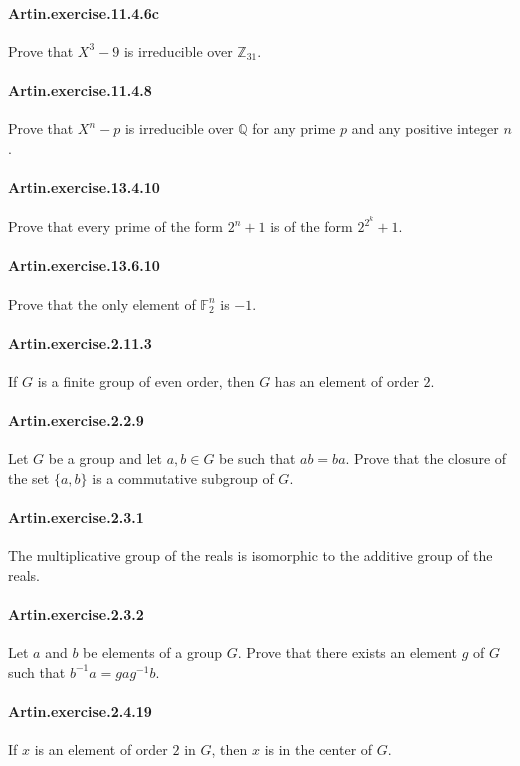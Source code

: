 \documentclass{article}
\begin{document}
\paragraph{Artin.exercise.11.4.6c} Prove that $X^3-9$ is irreducible over $\mathbb{Z}_{31}$.

\paragraph{Artin.exercise.11.4.8} Prove that $X^n-p$ is irreducible over $\mathbb{Q}$ for any prime $p$ and any positive integer $n$.

\paragraph{Artin.exercise.13.4.10} Prove that every prime of the form $2^n+1$ is of the form $2^{2^k}+1$.

\paragraph{Artin.exercise.13.6.10} Prove that the only element of $\mathbb{F}_2^n$ is $-1$.

\paragraph{Artin.exercise.2.11.3} If $G$ is a finite group of even order, then $G$ has an element of order $2$.

\paragraph{Artin.exercise.2.2.9} Let $G$ be a group and let $a, b \in G$ be such that $ab=ba$. Prove that the closure of the set $\{a, b\}$ is a commutative subgroup of $G$.

\paragraph{Artin.exercise.2.3.1} The multiplicative group of the reals is isomorphic to the additive group of the reals.

\paragraph{Artin.exercise.2.3.2} Let $a$ and $b$ be elements of a group $G$. Prove that there exists an element $g$ of $G$ such that $b^{-1}a=gag^{-1}b$.

\paragraph{Artin.exercise.2.4.19} If $x$ is an element of order $2$ in $G$, then $x$ is in the center of $G$.
\end{document}
